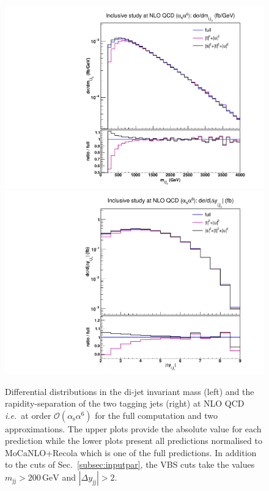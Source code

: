 \documentclass[twocolumn,epjc3]{svjour3} %
\newcommand{\Pj}{\ensuremath{\text{j}}\xspace}
\newcommand{\GeV}{\ensuremath{\,\text{GeV}}\xspace}
\newcommand{\alphas}{\ensuremath{\alpha_\text{s}}\xspace}
\begin{document}
    \begin{figure}[hbt]
    \centering
    {\includegraphics[scale=0.35]{figures/scanfigures/mjj_nlo.pdf}}
    {\includegraphics[scale=0.35]{figures/scanfigures/dyjj_nlo.pdf}}
    \caption{
    Differential distributions in the di-jet invariant mass (left) and the rapidity-separation of the two tagging jets (right) at NLO QCD \emph{i.e.}\ at order $\mathcal{O}(\alphas\alpha^6)$ for the full computation and two approximations.
    The upper plots provide the absolute value for each prediction while the lower plots present all predictions normalised to {\sc MoCaNLO}+{\sc Recola} which is one of the full predictions.
    In addition to the cuts of Sec.~\protect\ref{subsec:inputpar}, the VBS cuts take the values $m_{\Pj\Pj}>200 \GeV$ and $|\Delta y_{\Pj\Pj}|>2$.} 
    \label{fig:mjjdyjj_1d_1}
    \end{figure}
\end{document}
